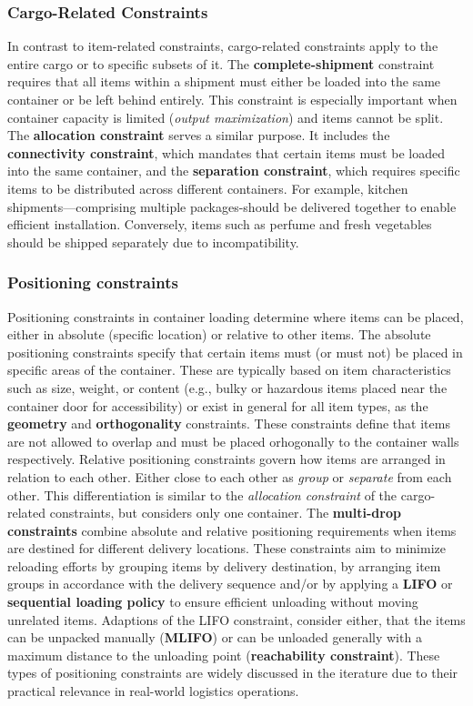 

\subsubsection{Cargo-Related Constraints}
In contrast to item-related constraints, cargo-related constraints apply to
the entire cargo or to specific subsets of it. The \textbf{complete-shipment} constraint
requires that all items within a shipment must either be loaded into the same
container or be left behind entirely. This constraint is especially important
when container capacity is limited (\textit{output maximization}) and items
cannot be split. The \textbf{allocation constraint} serves a similar purpose.
It includes the \textbf{connectivity constraint}, which mandates that
certain items must be loaded into the same container, and the
\textbf{separation constraint}, which requires specific items to
be distributed across different containers. For example, kitchen
shipments—comprising multiple packages-should be delivered together
to enable efficient installation. Conversely, items such as perfume and fresh
vegetables should be shipped separately due to incompatibility.

\subsubsection{Positioning constraints}

Positioning constraints in container loading determine where items can be placed,
either in absolute (specific location) or relative to other items.
The absolute positioning constraints specify that certain items
must (or must not) be placed in specific areas of the container. These are
typically based on item characteristics such as size, weight, or
content (e.g., bulky or hazardous items placed near the container door for accessibility) or
exist in general for all item types, as the \textbf{geometry} and
\textbf{orthogonality} constraints. These constraints define that items are not allowed to overlap
and must be placed orhogonally to the container walls respectively.
Relative positioning constraints govern how items are arranged in
relation to each other. Either close to each other as \textit{group} or
\textit{separate} from each other. This differentiation is similar to the
\textit{allocation constraint} of the cargo-related constraints, but considers
only one container.
The \textbf{multi-drop constraints} combine
absolute and relative positioning requirements when items are destined for
different delivery locations. These constraints aim to minimize reloading
efforts by grouping items by delivery destination, by arranging item groups
in accordance with the delivery sequence and/or by applying a
\textbf{\gls{LIFO}} or \textbf{sequential loading policy}
to ensure efficient unloading without moving unrelated items. Adaptions of the \gls{LIFO} constraint,
consider either, that the items can be unpacked manually (\textbf{\gls{MLIFO}}) or can be unloaded generally
with a maximum distance to the unloading point (\textbf{reachability constraint}). These
types of positioning constraints are widely discussed in the iterature due
to their practical relevance in real-world logistics operations.


